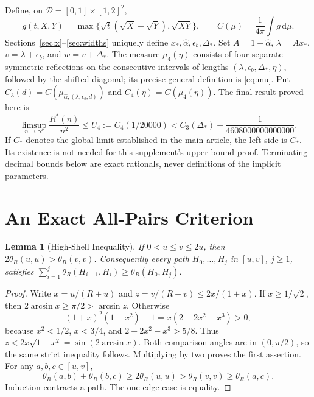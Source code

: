 \documentclass[11pt,letterpaper]{article}
\newtheorem{lemma}[theorem]{Lemma}
\newcommand{\Rstar}{R^*}
\newcommand{\thR}{\theta_R}
\newcommand{\dd}{\,\mathrm d}
\newcommand{\al}{\widehat\alpha}
\newcommand{\epsb}{\epsilon_b}
\newcommand{\Ds}{\Delta_*}
\begin{document}
Define, on $\mathcal D=[0,1]\times[1,2]^2$,
\begin{equation}\label{eq:g}
 g(t,X,Y)=\max\{\sqrt t(\sqrt X+\sqrt Y),\sqrt{XY}\},\qquad
 C(\mu)=\frac1{4\pi}\int g\dd\mu.
\end{equation}
Sections~\ref{sec:x}--\ref{sec:widths} uniquely define $x_*,\al,
\epsb,\Ds$. Set $A=1+\al$, $\lambda=Ax_*$,
$v=\lambda+\epsb$, and $w=v+\Ds$. The measure $\mu_4(\eta)$ consists
of four separate symmetric reflections on the consecutive intervals of
lengths $(\lambda,\epsb,\Ds,\eta)$, followed by the shifted diagonal;
its precise general definition is \eqref{eq:mu}. Put
$C_3(d)=C(\mu_{\al;(\lambda,\epsb,d)})$ and
$C_4(\eta)=C(\mu_4(\eta))$.
The final result proved here is
\begin{equation}\label{eq:target}
 \limsup_{n\to\infty}\frac{\Rstar(n)}{n^2}
 \le U_4:=C_4(1/20000)
 <C_3(\Ds)-\frac1{4608000000000000}.
\end{equation}
If $C_*$ denotes the global limit established in the main article,
the left side is $C_*$. Its existence is not needed for this supplement's
upper-bound proof. Terminating decimal bounds below are exact rationals,
never definitions of the implicit parameters.

\section{An Exact All-Pairs Criterion}
\begin{lemma}[High-Shell Inequality]\label{lem:shell}
If $0<u\le v\le2u$, then $2\thR(u,u)>\thR(v,v)$.
Consequently every path $H_0,\ldots,H_j$ in $[u,v]$, $j\ge1$, satisfies
$\sum_{i=1}^j\thR(H_{i-1},H_i)\ge\thR(H_0,H_j)$.
\end{lemma}
\begin{proof}
Write $x=u/(R+u)$ and $z=v/(R+v)\le2x/(1+x)$. If $x\ge1/\sqrt2$,
then $2\arcsin x\ge\pi/2>\arcsin z$. Otherwise
\[
 (1+x)^2(1-x^2)-1=x(2-2x^2-x^3)>0,
\]
because $x^2<1/2$, $x<3/4$, and $2-2x^2-x^3>5/8$.
Thus $z<2x\sqrt{1-x^2}=\sin(2\arcsin x)$. Both comparison angles
are in $(0,\pi/2)$, so the same strict inequality follows. Multiplying
by two proves the first assertion. For any $a,b,c\in[u,v]$,
\[
 \thR(a,b)+\thR(b,c)\ge2\thR(u,u)>\thR(v,v)\ge\thR(a,c).
\]
Induction contracts a path. The one-edge case is equality.
\end{proof}
\end{document}
